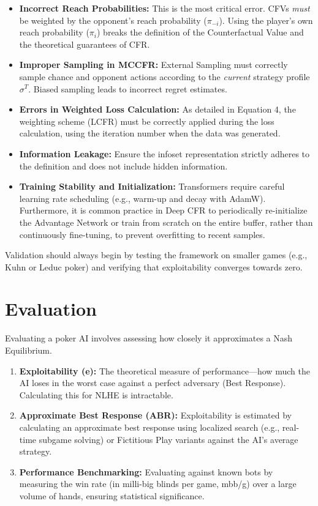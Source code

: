 \documentclass[11pt,a4paper]{article}
\begin{document}
\begin{itemize}
    \item \textbf{Incorrect Reach Probabilities:} This is the most critical error. CFVs \textit{must} be weighted by the opponent's reach probability ($\pi_{-i}$). Using the player's own reach probability ($\pi_{i}$) breaks the definition of the Counterfactual Value and the theoretical guarantees of CFR.
    \item \textbf{Improper Sampling in MCCFR:} External Sampling must correctly sample chance and opponent actions according to the \textit{current} strategy profile $\sigma^T$. Biased sampling leads to incorrect regret estimates.
    \item \textbf{Errors in Weighted Loss Calculation:} As detailed in Equation 4, the weighting scheme (LCFR) must be correctly applied during the loss calculation, using the iteration number when the data was generated.
    \item \textbf{Information Leakage:} Ensure the infoset representation strictly adheres to the definition and does not include hidden information.
    \item \textbf{Training Stability and Initialization:} Transformers require careful learning rate scheduling (e.g., warm-up and decay with AdamW). Furthermore, it is common practice in Deep CFR to periodically re-initialize the Advantage Network or train from scratch on the entire buffer, rather than continuously fine-tuning, to prevent overfitting to recent samples.
\end{itemize}

Validation should always begin by testing the framework on smaller games (e.g., Kuhn or Leduc poker) and verifying that exploitability converges towards zero.

\section{Evaluation}

Evaluating a poker AI involves assessing how closely it approximates a Nash Equilibrium.

\begin{enumerate}
    \item \textbf{Exploitability (e):} The theoretical measure of performance—how much the AI loses in the worst case against a perfect adversary (Best Response). Calculating this for NLHE is intractable.
    \item \textbf{Approximate Best Response (ABR):} Exploitability is estimated by calculating an approximate best response using localized search (e.g., real-time subgame solving) or Fictitious Play variants against the AI's average strategy.
    \item \textbf{Performance Benchmarking:} Evaluating against known bots by measuring the win rate (in milli-big blinds per game, mbb/g) over a large volume of hands, ensuring statistical significance.
\end{enumerate}
\end{document}
